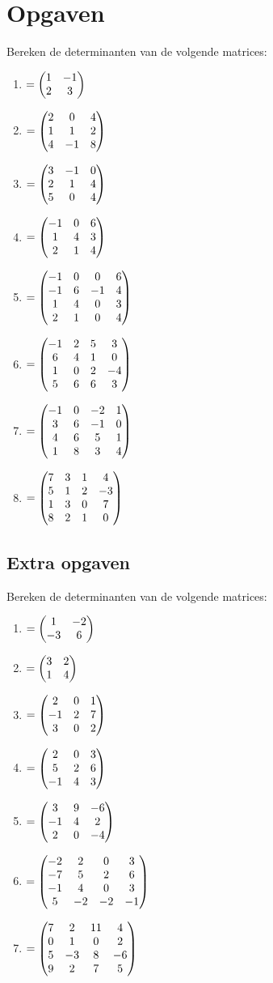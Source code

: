 \section{Opgaven}
Bereken de determinanten van de volgende matrices:\\
\begin{enumerate}[label=\Alph*]
	\item 
	$  = \begin{pmatrix} 1 & -1 \\  2 & 3 \end{pmatrix} $ \\
	\item 
	$  = \begin{pmatrix} 2 & 0 & 4 \\ 1 & 1 & 2 \\ 4 & -1 & 8 \end{pmatrix} $ \\
	\item 
	$  =  \begin{pmatrix} 3 & -1 & 0 \\ 2 & 1 & 4 \\ 5 & 0 & 4 \end{pmatrix} $ \\
	\item 
	$  =  \begin{pmatrix} -1 & 0 & 6 \\ 1 & 4 & 3 \\ 2 & 1 & 4 \end{pmatrix} $ \\ 
	\item 
	$   = \begin{pmatrix} -1 & 0 &  0 & 6 \\ -1 & 6 & -1 & 4 \\ 1 & 4 & 0 & 3 \\ 2 & 1 & 0 & 4 \end{pmatrix} $ \\
	\item 
	$  =  \begin{pmatrix} -1 & 2 &  5 & 3 \\ 6 & 4 & 1 & 0 \\ 1 & 0 & 2 & -4 \\ 5 & 6 & 6 & 3 \end{pmatrix} $ \\
	\item 
	$   = \begin{pmatrix} -1 & 0 &  -2 & 1 \\ 3 & 6 & -1 & 0 \\ 4 & 6 & 5 & 1 \\ 1 & 8 & 3 & 4 \end{pmatrix} $ \\
	\item 
	$  =  \begin{pmatrix} 7 & 3 &  1 & 4 \\ 5 & 1 & 2 & -3 \\ 1 & 3 & 0 & 7 \\ 8 & 2 & 1 & 0 \end{pmatrix} $
\end{enumerate}

\newpage
\subsection{Extra opgaven}
Bereken de determinanten van de volgende matrices:\\

\begin{enumerate}[label=\Alph*]
	\item 
	$   = \begin{pmatrix} 1 & -2 \\  -3 & 6 \end{pmatrix} $ \\ 
	\item 
	$  = \begin{pmatrix} 3 & 2  \\ 1 & 4  \end{pmatrix} $ \\
	\item 
	$ = \begin{pmatrix} 2 & 0 & 1 \\ -1 & 2 & 7 \\ 3 & 0 & 2 \end{pmatrix} $ \\
	\item  
	$  = \begin{pmatrix} 2 & 0 & 3 \\ 5 & 2 & 6 \\ -1 & 4 & 3 \end{pmatrix} $ \\  
	\item 
	$   = \begin{pmatrix} 3 & 9 &  -6  \\ -1 & 4 & 2  \\ 2 & 0 & -4  \end{pmatrix}
	$ \\
	\item 
	$  =  \begin{pmatrix} -2 & 2 &  0 & 3 \\ -7 & 5 & 2 & 6 \\ -1 & 4 & 0 & 3 \\ 5 & -2 & -2 & -1 \end{pmatrix} $ \\ 
	\item 
	$ = \begin{pmatrix} 7 & 2 &  11 & 4 \\ 0 & 1 & 0 & 2 \\ 5 & -3 & 8 & -6 \\ 9 & 2 & 7 & 5 \end{pmatrix} $
\end{enumerate}
